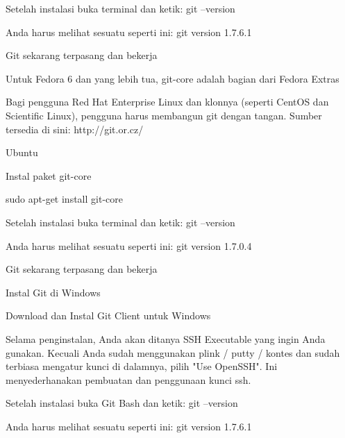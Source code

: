 Setelah instalasi buka terminal dan ketik: $  $git --version \par
\noindent 
Anda harus melihat sesuatu seperti ini: $  $git version 1.7.6.1 \par
\vspace{12pt}
\noindent 
Git sekarang terpasang dan bekerja \par
\vspace{12pt}
\noindent 
Untuk Fedora 6 dan yang lebih tua, git-core adalah bagian dari Fedora Extras  \par
\vspace{12pt}
\noindent 
Bagi pengguna Red Hat Enterprise Linux dan klonnya (seperti CentOS dan Scientific Linux), pengguna harus membangun git dengan tangan. $  $Sumber tersedia di sini: $  $http://git.or.cz/ \par
\vspace{12pt}
\noindent 
 $  $Ubuntu \par
\vspace{12pt}
\noindent 
Instal paket $  $git-core \par
\vspace{12pt}
\noindent 
sudo apt-get install git-core \par
\vspace{12pt}
\noindent 
Setelah instalasi buka terminal dan ketik: $  $git --version \par
\noindent 
Anda harus melihat sesuatu seperti ini: $  $git version 1.7.0.4 \par
\noindent 
Git sekarang terpasang dan bekerja \par
\vspace{12pt}
\noindent 
 $  $Instal Git di Windows \par
\vspace{12pt}
\noindent 
Download dan Instal Git Client untuk Windows \par
\noindent 
Selama penginstalan, Anda akan ditanya SSH Executable yang ingin Anda gunakan. $  $Kecuali Anda sudah menggunakan plink / putty / kontes dan sudah terbiasa mengatur kunci di dalamnya, pilih "Use OpenSSH". $  $Ini menyederhanakan pembuatan dan penggunaan kunci ssh. \par
\vspace{12pt}
\noindent 
Setelah instalasi buka Git Bash dan ketik: $  $git --version \par
\vspace{12pt}
\noindent 
Anda harus melihat sesuatu seperti ini: $  $git version 1.7.6.1 \par
\noindent 
